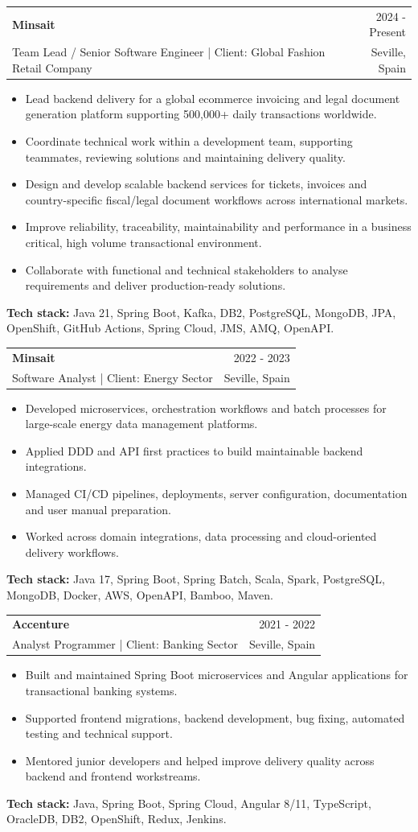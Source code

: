\documentclass[10.5pt,a4paper]{article}
\makeatletter
\newcommand{\role}[4]{
  \begin{tabularx}{\textwidth}{@{}X r@{}}
    \textbf{\large #1} & {\small\color{muted} #2} \\
    {\small #3} & {\small\color{muted} #4}
  \end{tabularx}
}
\newcommand{\stack}[1]{
  \vspace{1pt}
  {\small\color{muted}\textbf{Tech stack:} #1}
}
\makeatother
\begin{document}
\role{Minsait}{2024 - Present}{Team Lead / Senior Software Engineer | Client: Global Fashion Retail Company}{Seville, Spain}
\begin{itemize}
  \item Lead backend delivery for a global ecommerce invoicing and legal document generation platform supporting 500,000+ daily transactions worldwide.
  \item Coordinate technical work within a development team, supporting teammates, reviewing solutions and maintaining delivery quality.
  \item Design and develop scalable backend services for tickets, invoices and country-specific fiscal/legal document workflows across international markets.
  \item Improve reliability, traceability, maintainability and performance in a business critical, high volume transactional environment.
  \item Collaborate with functional and technical stakeholders to analyse requirements and deliver production-ready solutions.
\end{itemize}
\stack{Java 21, Spring Boot, Kafka, DB2, PostgreSQL, MongoDB, JPA, OpenShift, GitHub Actions, Spring Cloud, JMS, AMQ, OpenAPI.}

\vspace{8pt}
\role{Minsait}{2022 - 2023}{Software Analyst | Client: Energy Sector}{Seville, Spain}
\begin{itemize}
  \item Developed microservices, orchestration workflows and batch processes for large-scale energy data management platforms.
  \item Applied DDD and API first practices to build maintainable backend integrations.
  \item Managed CI/CD pipelines, deployments, server configuration, documentation and user manual preparation.
  \item Worked across domain integrations, data processing and cloud-oriented delivery workflows.
\end{itemize}
\stack{Java 17, Spring Boot, Spring Batch, Scala, Spark, PostgreSQL, MongoDB, Docker, AWS, OpenAPI, Bamboo, Maven.}

\newpage

\role{Accenture}{2021 - 2022}{Analyst Programmer | Client: Banking Sector}{Seville, Spain}
\begin{itemize}
  \item Built and maintained Spring Boot microservices and Angular applications for transactional banking systems.
  \item Supported frontend migrations, backend development, bug fixing, automated testing and technical support.
  \item Mentored junior developers and helped improve delivery quality across backend and frontend workstreams.
\end{itemize}
\stack{Java, Spring Boot, Spring Cloud, Angular 8/11, TypeScript, OracleDB, DB2, OpenShift, Redux, Jenkins.}
\end{document}
